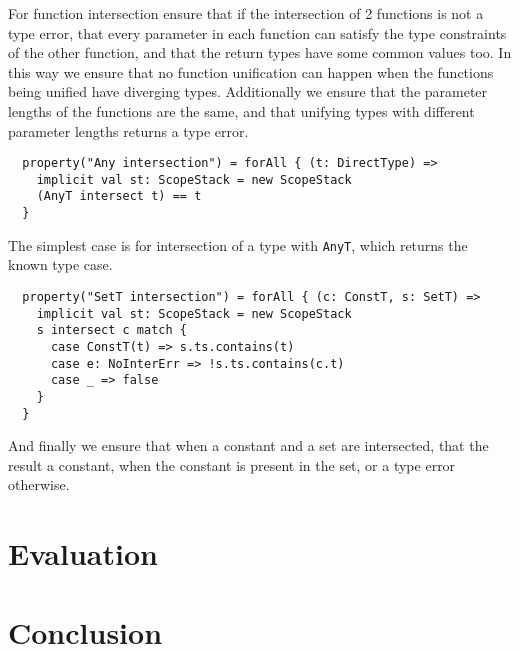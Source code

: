 \documentclass[british, twoside]{bhamthesis}
\theoremstyle{definition}
\begin{document}
      For function intersection ensure that if the intersection of 2 functions is not a type error, that every parameter in each function can satisfy the type constraints of the other function, and that the return types have some common values too. In this way we ensure that no function unification can happen when the functions being unified have diverging types. Additionally we ensure that the parameter lengths of the functions are the same, and that unifying types with different parameter lengths returns a type error.

      \begin{lstlisting}
  property("Any intersection") = forAll { (t: DirectType) =>
    implicit val st: ScopeStack = new ScopeStack
    (AnyT intersect t) == t
  }
      \end{lstlisting}

      The simplest case is for intersection of a type with \texttt{AnyT}, which returns the known type case.

      \begin{lstlisting}
  property("SetT intersection") = forAll { (c: ConstT, s: SetT) =>
    implicit val st: ScopeStack = new ScopeStack
    s intersect c match {
      case ConstT(t) => s.ts.contains(t)
      case e: NoInterErr => !s.ts.contains(c.t)
      case _ => false
    }
  }
      \end{lstlisting}

      And finally we ensure that when a constant and a set are intersected, that the result a constant, when the constant is present in the set, or a type error otherwise.

\chapter{Evaluation}
\chapter{Conclusion}

\printbibliography
\end{document}
